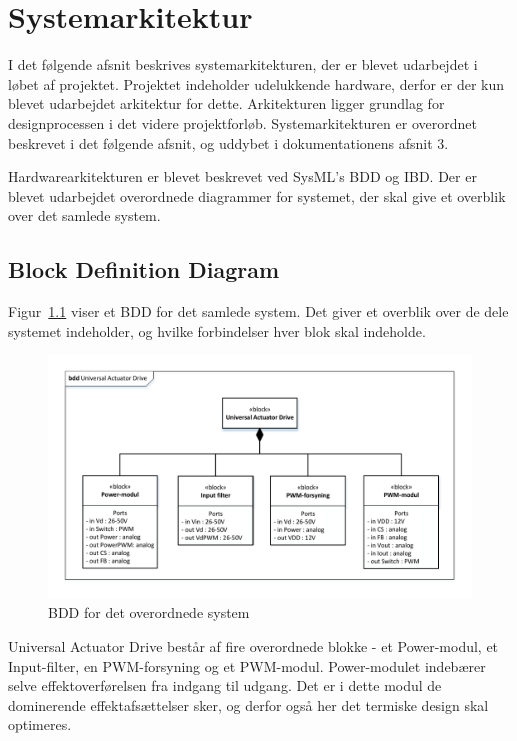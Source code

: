 
\chapter{Systemarkitektur}
I det følgende afsnit beskrives systemarkitekturen, der er blevet udarbejdet i løbet af projektet. Projektet indeholder udelukkende hardware, derfor er der kun blevet udarbejdet arkitektur for dette. Arkitekturen ligger grundlag for designprocessen i det videre projektforløb. Systemarkitekturen er overordnet beskrevet i det følgende afsnit, og uddybet i dokumentationens afsnit 3.

Hardwarearkitekturen er blevet beskrevet ved SysML's BDD og IBD. Der er blevet udarbejdet overordnede diagrammer for systemet, der skal give et overblik over det samlede system.

\section{Block Definition Diagram}
Figur~\ref{fig:BDD} viser et BDD for det samlede system. Det giver et overblik over de dele systemet indeholder, og hvilke forbindelser hver blok skal indeholde. 

\begin{figure}[H]
	\centering
	\includegraphics[width=1\linewidth]{../Dokumentation/tex/systemarkitektur/billeder/BDD.pdf}
	\caption{BDD for det overordnede system}
	\label{fig:BDD}
\end{figure}

\noindent Universal Actuator Drive består af fire overordnede blokke - et Power-modul, et Input-filter, en PWM-forsyning og et PWM-modul. Power-modulet indebærer selve effektoverførelsen fra indgang til udgang. Det er i dette modul de dominerende effektafsættelser sker, og derfor også her det termiske design skal optimeres. 

